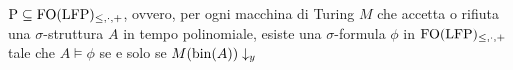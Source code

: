 \begin{corollario}
\label{cor:P-subset-FO(LFP)}
 $\operatorname{P} \subseteq \operatorname{FO}(\operatorname{LFP})_{\leq,\cdot,+}$, ovvero, per ogni macchina di Turing $M$ che accetta o
 rifiuta una $\sigma$-struttura $A$ in tempo polinomiale, esiste una
 $\sigma$-formula $\phi$ in $\operatorname{FO}(\operatorname{LFP})_{\leq,\cdot,+}$ tale che
 $A \models \phi$ se e solo se $M(\operatorname{bin}(A))\downarrow_y$
\end{corollario}



